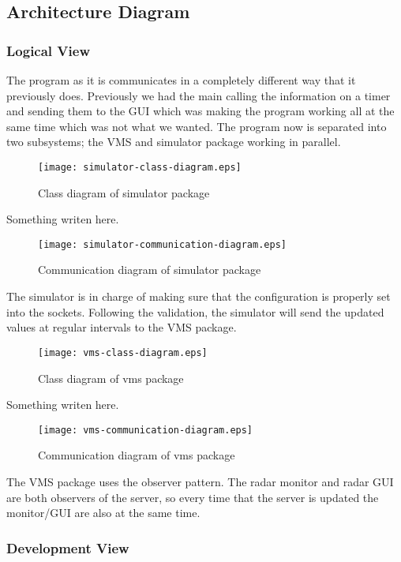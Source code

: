 \documentclass{article}
\begin{document}
\subsection{Architecture Diagram}

\subsubsection{Logical View}

The program as it is communicates in a completely different way that it previously does. Previously we had the main calling the information on a timer and sending them to the GUI which was making the program working all at the same time which was not what we wanted. The program now is separated into two subsystems; the VMS and simulator package working in parallel.

\begin{figure}[h]
\caption{Class diagram of simulator package}
\texttt{[image:  simulator-class-diagram.eps]}
\end{figure}

Something writen here.

\begin{figure}[h]
\caption{Communication diagram of simulator package}
\texttt{[image: simulator-communication-diagram.eps]}
\end{figure}

The simulator is in charge of making sure that the configuration is properly set into the sockets. Following the validation, the simulator will send the updated values at regular intervals to the VMS package.

\begin{figure}[h]	
\caption{Class diagram of vms package}
\texttt{[image: vms-class-diagram.eps]}
\end{figure}

Something writen here.

\begin{figure}[h]
\caption{Communication diagram of vms package}
\texttt{[image: vms-communication-diagram.eps]}
\end{figure}

The VMS package uses the observer pattern. The radar monitor and radar GUI are both observers of the server, so every time that the server is updated the monitor/GUI are also at the same time.

\subsubsection{Development View}
\end{document}
